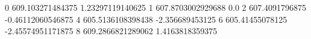 0 609.103271484375 1.23297119140625
1 607.8703002929688 0.0
2 607.4091796875 -0.46112060546875
4 605.5136108398438 -2.356689453125
6 605.41455078125 -2.45574951171875
8 609.2866821289062 1.4163818359375
